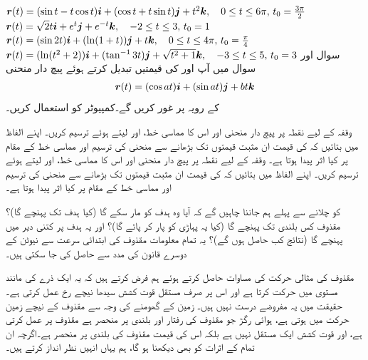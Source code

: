 ${{\boldsymbol{r}}}(t)=(\sin t-t\cos t){\boldsymbol{i}}+(\cos t+t\sin t){\boldsymbol{j}}+t^2{\boldsymbol{k}},\quad 0\le t\le 6\pi,\, t_0=\frac{3\pi}{2}$
${{\boldsymbol{r}}}(t)=\sqrt{2}t{\boldsymbol{i}}+e^t{\boldsymbol{j}}+e^{-t}{\boldsymbol{k}},\quad -2\le t\le 3,\, t_0=1$
${{\boldsymbol{r}}}(t)=(\sin 2t){\boldsymbol{i}}+(\ln(1+t)){\boldsymbol{j}}+t{\boldsymbol{k}},\quad 0\le t\le 4\pi,\, t_0=\frac{\pi}{4}$
${{\boldsymbol{r}}}(t)=(\ln(t^2+2)){\boldsymbol{i}}+(\tan^{-1}3t){\boldsymbol{j}}+\sqrt{t^2+1}{\boldsymbol{k}},\quad -3\le t\le 5,\, t_0=3$
سوال  اور سوال    میں  آپ   اور  کی قیمتیں تبدیل کرتے ہوئے پیچ دار منحنی
\begin{align*}
{\ensuremath{{\boldsymbol{r}}}}(t)=(\cos at){\boldsymbol{i}}+(\sin at){\boldsymbol{j}}+bt {\boldsymbol{k}}
\end{align*}
کے رویہ پر غور کریں گے۔کمپیوٹر کو استعمال کریں۔

وقفہ  کے لیے نقطہ   پر پیچ دار منحنی اور اس کا مماسی خط،   اور  لیتے ہوئے    ترسیم کریں۔ اپنے الفاظ میں بتائیں  کہ  کی قیمت ان مثبت  قیمتوں تک بڑھانے سے منحنی   کی ترسیم اور مماسی خط کے مقام  پر کیا اثر پیدا ہوتا ہے۔ 
وقفہ  کے لیے نقطہ   پر پیچ دار منحنی اور اس کا مماسی خط،   اور  لیتے ہوئے    ترسیم کریں۔ اپنے الفاظ میں بتائیں  کہ  کی قیمت ان مثبت  قیمتوں   تک بڑھانے سے منحنی   کی ترسیم اور مماسی خط کے مقام  پر کیا اثر پیدا ہوتا ہے۔ 


 کو چلانے سے پہلے  ہم جاننا چاہیں گے کہ آیا وہ ہدف کو مار سکے گا (کیا ہدف تک پہنچے گا)؟    مقذوف کس  بلندی  تک  پہنچے گا (کیا یہ  پہاڑی کو پار کر پائے گا)؟ اور  یہ ہدف پر کتنی دیر میں پہنچے گا (نتائج   کب حاصل  ہوں گے)؟ یہ تمام معلومات  مقذوف کی ابتدائی سرعت سے نیوٹن کے دوسرے قانون کی مدد سے حاصل کی جا سکتی ہیں۔

مقذوف کی  مثالی حرکت   کی  مساوات حاصل کرتے ہوئے ہم  فرض کرتے ہیں کہ یہ ایک ذرے کی مانند مستوی میں حرکت کرتا ہے اور اس پر صرف  مستقل   قوت کشش   سیدھا نیچے رخ عمل   کرتی ہے۔ حقیقت میں یہ مفروضے  درست نہیں  ہیں۔ زمین کے  گھومنے کی وجہ سے مقذوف کے نیچے    زمین  حرکت میں ہوتی  ہے، ہوائی  رگڑ  جو  مقذوف کی رفتار اور بلندی پر منحصر ہے مقذوف    پر عمل کرتی ہے، اور قوت کشش ایک مستقل نہیں ہے بلکہ اس کی قیمت  مقذوف کی بلندی پر منحصر ہے۔اگرچہ ان تمام کے اثرات کو بھی دیکھنا ہو گا، ہم یہاں انہیں نظر انداز کرتے ہیں۔

